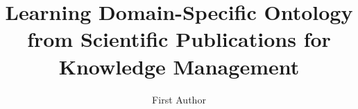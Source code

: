 \documentclass[11pt]{article}
\title{Learning Domain-Specific Ontology from Scientific Publications for Knowledge Management}
\author{First Author \\
}
\date{}
\begin{document}
\maketitle
\begin{abstract}
\end{abstract}












\end{document}
